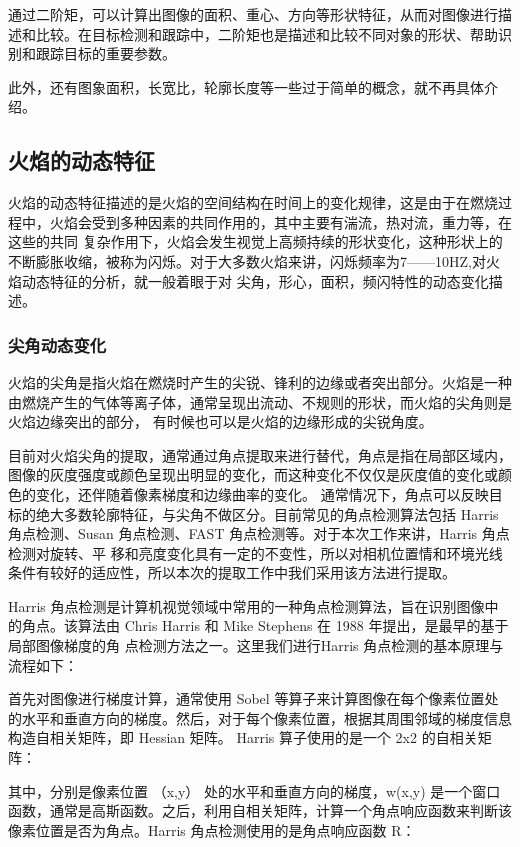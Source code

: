 通过二阶矩，可以计算出图像的面积、重心、方向等形状特征，从而对图像进行描述和比较。在目标检测和跟踪中，二阶矩也是描述和比较不同对象的形状、帮助识别和跟踪目标的重要参数。

此外，还有图象面积，长宽比，轮廓长度等一些过于简单的概念，就不再具体介绍。

\subsection{火焰的动态特征}
火焰的动态特征描述的是火焰的空间结构在时间上的变化规律，这是由于在燃烧过程中，火焰会受到多种因素的共同作用的，其中主要有湍流，热对流，重力等，在这些的共同
复杂作用下，火焰会发生视觉上高频持续的形状变化，这种形状上的不断膨胀收缩，被称为闪烁。对于大多数火焰来讲，闪烁频率为7——10HZ,对火焰动态特征的分析，就一般着眼于对
尖角，形心，面积，频闪特性的动态变化描述。
\subsubsection{尖角动态变化}
火焰的尖角是指火焰在燃烧时产生的尖锐、锋利的边缘或者突出部分。火焰是一种由燃烧产生的气体等离子体，通常呈现出流动、不规则的形状，而火焰的尖角则是火焰边缘突出的部分，
有时候也可以是火焰的边缘形成的尖锐角度。

目前对火焰尖角的提取，通常通过角点提取来进行替代，角点是指在局部区域内，图像的灰度强度或颜色呈现出明显的变化，而这种变化不仅仅是灰度值的变化或颜色的变化，还伴随着像素梯度和边缘曲率的变化。
通常情况下，角点可以反映目标的绝大多数轮廓特征，与尖角不做区分。目前常见的角点检测算法包括 Harris 角点检测、Susan 角点检测、FAST 角点检测等。对于本次工作来讲，Harris 角点检测对旋转、平
移和亮度变化具有一定的不变性，所以对相机位置情和环境光线条件有较好的适应性，所以本次的提取工作中我们采用该方法进行提取。

Harris 角点检测是计算机视觉领域中常用的一种角点检测算法，旨在识别图像中的角点。该算法由 Chris Harris 和 Mike Stephens 在 1988 年提出，是最早的基于局部图像梯度的角
点检测方法之一。这里我们进行Harris 角点检测的基本原理与流程如下：

首先对图像进行梯度计算，通常使用 Sobel 等算子来计算图像在每个像素位置处的水平和垂直方向的梯度。然后，对于每个像素位置，根据其周围邻域的梯度信息构造自相关矩阵，即 Hessian 矩阵。
Harris 算子使用的是一个 2x2 的自相关矩阵：

其中，分别是像素位置 （x,y） 处的水平和垂直方向的梯度，w(x,y) 是一个窗口函数，通常是高斯函数。之后，利用自相关矩阵，计算一个角点响应函数来判断该像素位置是否为角点。Harris 角点检测使用的是角点响应函数 
R：

